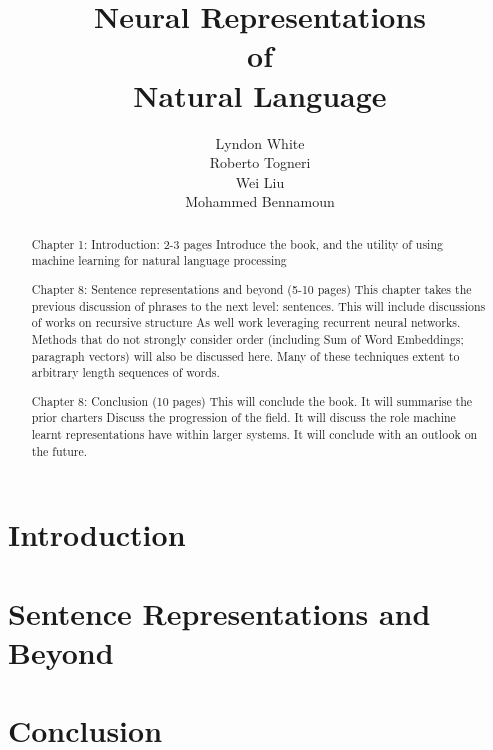 \documentclass[12pt,parskip]{komatufte}
\begin{document}
\title{Neural Representations \\of\\ Natural Language}
\author{Lyndon White\\ Roberto Togneri\\ Wei Liu\\ Mohammed Bennamoun}
\publishers{SpringerBriefs in Computer Science}


\maketitle
\tableofcontents

\chapter{Introduction}\label{sec:introduction}
\begin{abstract}
	Chapter 1: Introduction: 2-3 pages
Introduce the book, and the utility of using machine learning for natural language processing
\end{abstract}














\chapter{Sentence Representations and Beyond}\label{sec:sentence-representations-and-beyond}
\begin{abstract}
Chapter 8: Sentence representations and beyond (5-10 pages)
This chapter takes the previous discussion of phrases to the next level: sentences.
This will include discussions of works on recursive structure
As well work leveraging recurrent neural networks.
Methods that do not strongly consider order (including Sum of Word Embeddings; paragraph vectors) will also be discussed here.
Many of these techniques extent to arbitrary length sequences of words.
\end{abstract}


\chapter{Conclusion}\label{sec:conclusion}
\begin{abstract}
Chapter 8: Conclusion (10 pages)
This will conclude the book. 
It will summarise the prior charters
Discuss the progression of the field.
It will discuss the role machine learnt representations have within larger systems.
It will conclude with an outlook on the future.
\end{abstract}


\clearpage
{}
\printbibliography
\end{document}
